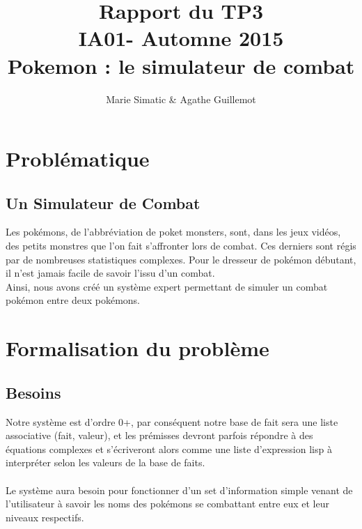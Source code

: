 \documentclass[a4paper, 12pt, final]{article}
\title{Rapport du TP3\\
  IA01- Automne 2015
  \\Pokemon : le simulateur de combat}
\author{Marie Simatic \& Agathe Guillemot}
\begin{document}
\maketitle{}
\newpage
\tableofcontents
\newpage
\section{Problématique}

\subsection{Un Simulateur de Combat}
Les pokémons, de l'abbréviation de poket monsters, sont, dans les jeux vidéos, des petits monstres que l'on fait s'affronter lors de combat. Ces derniers sont régis par de nombreuses statistiques complexes. Pour le dresseur de pokémon débutant, il n'est jamais facile de savoir l'issu d'un combat.\\
Ainsi, nous avons créé un système expert permettant de simuler un combat pokémon entre deux pokémons.

\section{Formalisation du problème}
\subsection{Besoins}
Notre système est d'ordre 0+, par conséquent notre base de fait sera
une liste associative (fait, valeur), et les prémisses devront parfois répondre à des équations complexes et s'écriveront alors comme une liste d'expression lisp à interpréter selon les valeurs de la base de faits.\\
\\
Le système aura besoin pour fonctionner d'un set d'information simple venant de l'utilisateur à savoir les noms des pokémons se combattant entre eux et leur niveaux respectifs.
\end{document}
